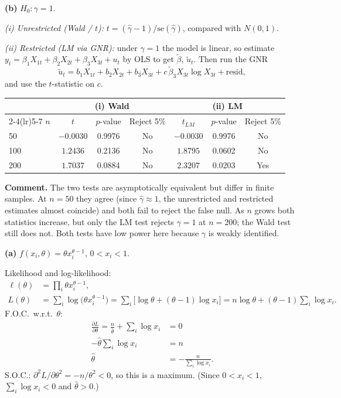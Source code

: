 \documentclass[11pt]{article}
\begin{document}
\textbf{(b)} $H_0:\gamma=1$.

\emph{(i) Unrestricted (Wald / $t$):} $t=(\hat\gamma-1)/\text{se}(\hat\gamma)$, compared with $N(0,1)$.

\emph{(ii) Restricted (LM via GNR):} under $\gamma=1$ the model is linear, so estimate
$y_t=\beta_1X_{1t}+\beta_2X_{2t}+\beta_3X_{3t}+u_t$ by OLS to get $\tilde\beta$, $\tilde u_t$. Then run the GNR
\[
  \tilde u_t = b_1X_{1t}+b_2X_{2t}+b_3X_{3t}+c\,\tilde\beta_3X_{3t}\log X_{3t}+\text{resid},
\]
and use the $t$-statistic on $c$.

\begin{center}
\begin{tabular}{lcccccc}
\toprule
 & \multicolumn{3}{c}{(i) Wald} & \multicolumn{3}{c}{(ii) LM} \\
\cmidrule(lr){2-4}\cmidrule(lr){5-7}
$n$ & $t$ & $p$-value & Reject 5\% & $t_{LM}$ & $p$-value & Reject 5\% \\
\midrule
50  & $-0.0030$ & 0.9976 & No & $-0.0030$ & 0.9976 & No \\
100 & $1.2436$  & 0.2136 & No & $1.8795$  & 0.0602 & No \\
200 & $1.7037$  & 0.0884 & No & $2.3207$  & 0.0203 & Yes \\
\bottomrule
\end{tabular}
\end{center}

\textbf{Comment.} The two tests are asymptotically equivalent but differ in finite samples. At $n=50$ they agree
(since $\hat\gamma\approx1$, the unrestricted and restricted estimates almost coincide) and both fail to reject the
false null. As $n$ grows both statistics increase, but only the LM test rejects $\gamma=1$ at $n=200$; the Wald test
still does not. Both tests have low power here because $\gamma$ is weakly identified.


\textbf{(a)} $f(x_i,\theta)=\theta x_i^{\theta-1}$, $0<x_i<1$.

Likelihood and log-likelihood:
\begin{align*}
  \ell(\theta)&=\prod_i\theta x_i^{\theta-1},\\
  L(\theta)&=\sum_i\log\bigl(\theta x_i^{\theta-1}\bigr)=\sum_i\bigl[\log\theta+(\theta-1)\log x_i\bigr]
  =n\log\theta+(\theta-1)\sum_i\log x_i .
\end{align*}
F.O.C.\ w.r.t.\ $\theta$:
\begin{align*}
  \frac{\partial L}{\partial\theta}=\frac{n}{\hat\theta}+\sum_i\log x_i&=0\\
  -\hat\theta\sum_i\log x_i&=n\\
  \hat\theta&=-\frac{n}{\sum_i\log x_i}.
\end{align*}
S.O.C.: $\partial^2L/\partial\theta^2=-n/\theta^2<0$, so this is a maximum. (Since $0<x_i<1$, $\sum_i\log x_i<0$ and $\hat\theta>0$.)
\end{document}
